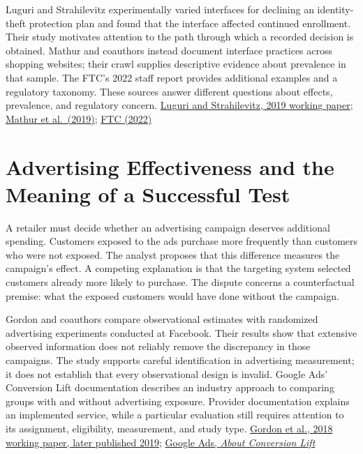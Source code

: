Luguri and Strahilevitz experimentally varied interfaces for declining
an identity-theft protection plan and found that the interface affected
continued enrollment. Their study motivates attention to the path
through which a recorded decision is obtained. Mathur and coauthors
instead document interface practices across shopping websites; their
crawl supplies descriptive evidence about prevalence in that sample. The
FTC's 2022 staff report provides additional examples and a regulatory
taxonomy. These sources answer different questions about effects,
prevalence, and regulatory concern.
\href{https://oag.ca.gov/sites/all/files/agweb/pdfs/privacy/shining-a-light-on-dark-patterns.pdf}{Luguri
and Strahilevitz, 2019 working paper};
\href{https://arxiv.org/abs/1907.07032}{Mathur et al.~(2019)};
\href{https://www.ftc.gov/reports/bringing-dark-patterns-light}{FTC
(2022)}


\hypertarget{M09-advertising-effectiveness-and-the-meaning-of-a-successful-test}{%
\section{Advertising Effectiveness and the Meaning of a Successful
Test}\label{M09-advertising-effectiveness-and-the-meaning-of-a-successful-test}}

\noindent \noindent A retailer must decide whether an advertising campaign
deserves additional spending. Customers exposed to the ads purchase more
frequently than customers who were not exposed. The analyst proposes
that this difference measures the campaign's effect. A competing
explanation is that the targeting system selected customers already more
likely to purchase. The dispute concerns a counterfactual premise: what
the exposed customers would have done without the campaign.

Gordon and coauthors compare observational estimates with randomized
advertising experiments conducted at Facebook. Their results show that
extensive observed information does not reliably remove the discrepancy
in those campaigns. The study supports careful identification in
advertising measurement; it does not establish that every observational
design is invalid. Google Ads' Conversion Lift documentation describes
an industry approach to comparing groups with and without advertising
exposure. Provider documentation explains an implemented service, while
a particular evaluation still requires attention to its assignment,
eligibility, measurement, and study type.
\href{https://www.kellogg.northwestern.edu/faculty/gordon_b/files/fb_comparison.pdf}{Gordon
et al., 2018 working paper, later published 2019};
\href{https://support.google.com/google-ads/answer/12003020?hl=en}{Google
Ads, \emph{About Conversion Lift}}

